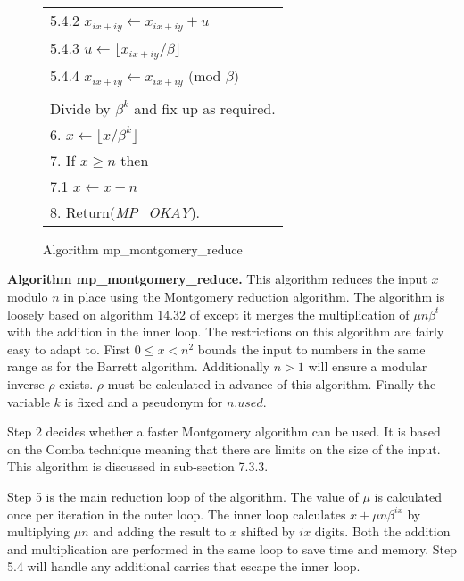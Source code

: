 \documentclass[b5paper]{book}
\begin{document}
\begin{figure}[!here]
\begin{small}
\begin{center}
\begin{tabular}{l}
\hspace{6mm}5.4.2  $x_{ix + iy} \leftarrow x_{ix + iy} + u$ \\
\hspace{6mm}5.4.3  $u \leftarrow \lfloor x_{ix+iy} / \beta \rfloor$ \\
\hspace{6mm}5.4.4  $x_{ix + iy} \leftarrow x_{ix+iy} \mbox{ (mod }\beta\mbox{)}$ \\
\\
Divide by $\beta^k$ and fix up as required. \\
6.  $x \leftarrow \lfloor x / \beta^k \rfloor$ \\
7.  If $x \ge n$ then \\
\hspace{3mm}7.1  $x \leftarrow x - n$ \\
8.  Return(\textit{MP\_OKAY}). \\
\hline
\end{tabular}
\end{center}
\end{small}
\caption{Algorithm mp\_montgomery\_reduce}
\end{figure}

\textbf{Algorithm mp\_montgomery\_reduce.}
This algorithm reduces the input $x$ modulo $n$ in place using the Montgomery reduction algorithm.  The algorithm is loosely based
on algorithm 14.32 of \cite[pp.601]{HAC} except it merges the multiplication of $\mu n \beta^t$ with the addition in the inner loop.  The
restrictions on this algorithm are fairly easy to adapt to.  First $0 \le x < n^2$ bounds the input to numbers in the same range as 
for the Barrett algorithm.  Additionally $n > 1$ will ensure a modular inverse $\rho$ exists.  $\rho$ must be calculated in
advance of this algorithm.  Finally the variable $k$ is fixed and a pseudonym for $n.used$.  

Step 2 decides whether a faster Montgomery algorithm can be used.  It is based on the Comba technique meaning that there are limits on
the size of the input.  This algorithm is discussed in sub-section 7.3.3.

Step 5 is the main reduction loop of the algorithm.  The value of $\mu$ is calculated once per iteration in the outer loop.  The inner loop
calculates $x + \mu n \beta^{ix}$ by multiplying $\mu n$ and adding the result to $x$ shifted by $ix$ digits.  Both the addition and
multiplication are performed in the same loop to save time and memory.  Step 5.4 will handle any additional carries that escape the inner loop.
\end{document}
